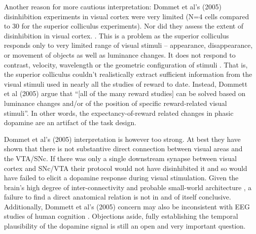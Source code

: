 {    Another reason for more cautious interpretation: Dommet et al's (2005) disinhibition experiments in visual cortex were very limited (N=4 cells compared to 30 for the superior colliculus experiments).  Nor did they assess the extent of disinhibition in visual cortex.
}. This is a problem as the superior colliculus responds only to very limited range of visual stimuli -- appearance, disappearance, or movement of objects as well as luminance changes.  It does not respond to contrast, velocity, wavelength or the geometric configuration of stimuli \cite{Dommett:2005p7263}. That is, the superior colliculus couldn't realistically extract sufficient information from the visual stimuli used in nearly all the studies of reward to date.  Instead, Dommett et al (2005) argue that ``[all of the many reward studies] can be solved based on luminance changes and/or of the position of specific reward-related visual stimuli''.  In other words, the expectancy-of-reward related changes in phasic dopamine are an artifact of the task design.  

 Dommet et al's (2005) interpretation is however too strong.  At best they have shown that there is not substantive direct connection between visual areas and the VTA/SNc.  If there was only a single downstream synapse between visual cortex and SNc/VTA their protocol would not have disinhibited it and so would have failed to elicit a dopamine response during visual stimulation.   Given the brain's high degree of inter-connectivity and probable small-world architecture \cite{bassett:2006aa}, a failure to find a direct anatomical relation is not in and of itself conclusive.  Additionally, Dommett et al's (2005) concern may also be inconsistent with EEG studies of human cognition \cite{Hillyard:1983p9844}. Objections aside, fully establishing the temporal plausibility of the dopamine signal is still an open and very important question.

